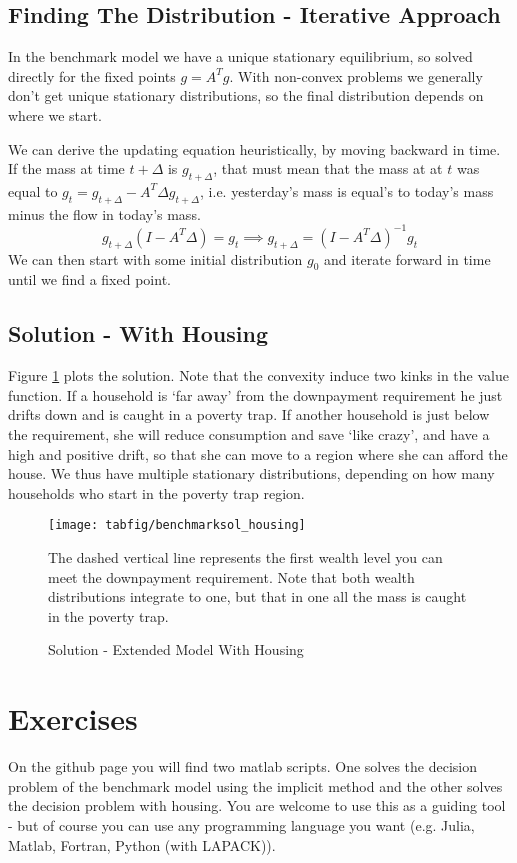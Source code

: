 \documentclass[12pt]{article}
\DeclareMathOperator{\1}{\mathbbm{1}}
\begin{document}
\subsection{Finding The Distribution - Iterative Approach}
In the benchmark model we have a unique stationary equilibrium, so solved directly for the fixed points $g=A^Tg$. With non-convex problems we generally don't get unique stationary distributions, so the final distribution depends on where we start.

We can derive the updating equation heuristically, by moving backward in time. If the mass at time $t+\Delta$ is $g_{t+\Delta}$, that must mean that the mass at at $t$ was equal to $g_t=g_{t+\Delta} - A^T\Delta g_{t+\Delta}$, i.e. yesterday's mass is equal's to today's mass minus the flow in today's mass.
\begin{equation}
g_{t+\Delta}(I - A^T\Delta)=g_t \implies g_{t+\Delta}  = (I - A^T\Delta)^{-1}g_t
\end{equation}
We can then start with some initial distribution $g_0$ and iterate forward in time until we find a fixed point. 
\subsection{Solution - With Housing}
Figure \ref{fig:solHousing} plots the solution. Note that the convexity induce two kinks in the value function. If a household is `far away' from the downpayment requirement he just drifts down and is caught in a poverty trap. If another household is just below the requirement, she will reduce consumption and save `like crazy', and have a high and positive drift, so that she can move to a region where she can afford the house. We thus have multiple stationary distributions, depending on how many households who start in the poverty trap region.
\begin{figure}

\begin{center}
\caption{Solution - Extended Model With Housing}
\label{fig:solHousing}
\texttt{[image: tabfig/benchmarksol\_housing]}
\end{center}
{\small

The dashed vertical line represents the first wealth level you can meet the downpayment requirement. Note that both wealth distributions integrate to one, but that in one all the mass is caught in the poverty trap. }
\end{figure}

\section*{Exercises}
On the github page you will find two matlab scripts. One solves the decision problem of the benchmark model using the implicit method and the other solves the decision problem with housing. You are welcome to use this as a guiding tool - but of course you can use any programming language you want (e.g. Julia, Matlab, Fortran, Python (with LAPACK)).
\end{document}
